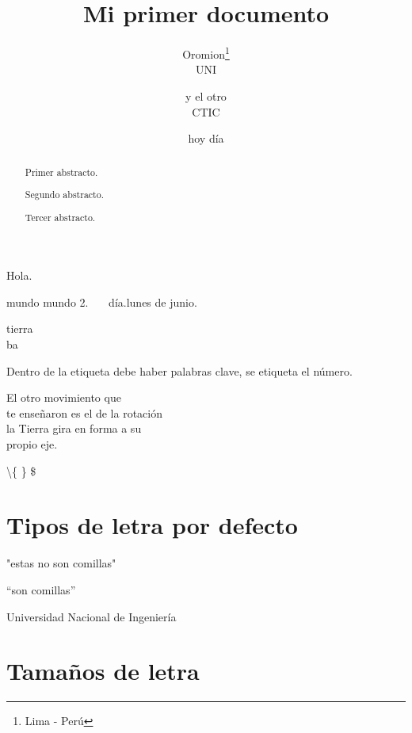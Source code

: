 \documentclass{article}
\title{Mi primer documento}
\author{Oromion\thanks{Lima - Perú}\\UNI\and y el otro\\CTIC}
\date{hoy día}
\begin{document}
\maketitle
\thispagestyle{empty}

\begin{abstract}
Primer abstracto.
\end{abstract}

\renewcommand{\abstractname}{Abstract}
\begin{abstract}
Segundo abstracto.
\end{abstract}
\renewcommand{\abstractname}{}

\begin{abstract}
Tercer abstracto.
\end{abstract}

\newpage
\vspace*{4cm}
Hola.

\vspace{2cm}

\hspace*{3cm} mundo \hspace{4cm} mundo 2. \ \ \ día.\quad lunes de junio.

tierra\\ b\medskip a
\enlargethispage{2mm}
\lipsum[2-4]

Dentro de la etiqueta debe haber palabras clave,  se etiqueta el número.

\newpage
\begin{flushright}
El otro movimiento que\\ te enseñaron es el de la rotación\\ la Tierra gira en forma a su\\ propio eje. 
\end{flushright}

\textbackslash \{ \} \$
\section[Letra]{Tipos de letra por defecto}
"estas no son comillas"

``son comillas''


Universidad Nacional de Ingeniería
\section[Tamaño]{Tamaños de letra}\label{sec:2}
\end{document}
